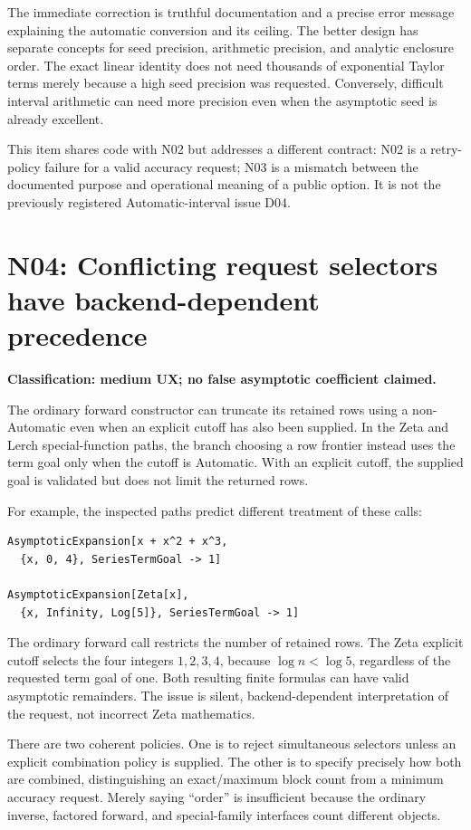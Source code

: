 \documentclass[11pt,a4paper]{article}
\newcommand{\code}[1]{\texttt{\detokenize{#1}}}
\newcommand{\finding}[3]{\Needspace{7\baselineskip}\section{#1: #2}\textbf{Classification: #3.}\par}
\begin{document}
The immediate correction is truthful documentation and a precise error message explaining the automatic conversion and its ceiling. The better design has separate concepts for seed precision, arithmetic precision, and analytic enclosure order. The exact linear identity does not need thousands of exponential Taylor terms merely because a high seed precision was requested. Conversely, difficult interval arithmetic can need more precision even when the asymptotic seed is already excellent.

This item shares code with N02 but addresses a different contract: N02 is a retry-policy failure for a valid accuracy request; N03 is a mismatch between the documented purpose and operational meaning of a public option. It is not the previously registered Automatic-interval issue D04.

\finding{N04}{Conflicting request selectors have backend-dependent precedence}{medium UX; no false asymptotic coefficient claimed}

The ordinary forward constructor can truncate its retained rows using a non-Automatic \code{SeriesTermGoal} even when an explicit cutoff has also been supplied. In the Zeta and Lerch special-function paths, the branch choosing a row frontier instead uses the term goal only when the cutoff is Automatic. With an explicit cutoff, the supplied goal is validated but does not limit the returned rows.\cite{main,dirichlet}

For example, the inspected paths predict different treatment of these calls:
\begin{lstlisting}
AsymptoticExpansion[x + x^2 + x^3,
  {x, 0, 4}, SeriesTermGoal -> 1]

AsymptoticExpansion[Zeta[x],
  {x, Infinity, Log[5]}, SeriesTermGoal -> 1]
\end{lstlisting}
The ordinary forward call restricts the number of retained rows. The Zeta explicit cutoff selects the four integers \(1,2,3,4\), because \(\log n<\log5\), regardless of the requested term goal of one. Both resulting finite formulas can have valid asymptotic remainders. The issue is silent, backend-dependent interpretation of the request, not incorrect Zeta mathematics.

There are two coherent policies. One is to reject simultaneous selectors unless an explicit combination policy is supplied. The other is to specify precisely how both are combined, distinguishing an exact/maximum block count from a minimum accuracy request. Merely saying ``order'' is insufficient because the ordinary inverse, factored forward, and special-family interfaces count different objects.
\end{document}
